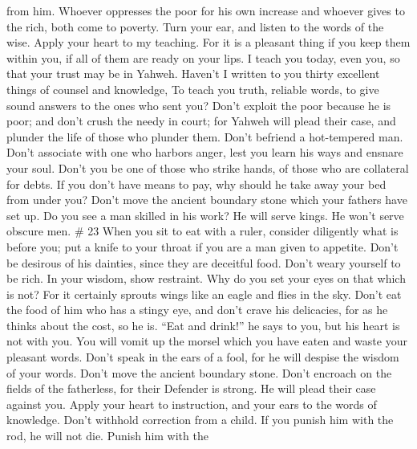 from him.  Whoever oppresses the poor for his own
increase and whoever gives to the rich, both come to poverty.
 Turn your ear, and listen to the words of the wise.
Apply your heart to my teaching.  For it is a pleasant
thing if you keep them within you, if all of them are ready on your
lips.  I teach you today, even you, so that your trust
may be in Yahweh.  Haven't I written to you thirty
excellent things of counsel and knowledge,  To teach you
truth, reliable words, to give sound answers to the ones who sent you?
 Don't exploit the poor because he is poor; and don't
crush the needy in court;  for Yahweh will plead their
case, and plunder the life of those who plunder them. 
Don't befriend a hot-tempered man. Don't associate with one who harbors
anger,  lest you learn his ways and ensnare your soul.
 Don't you be one of those who strike hands, of those who
are collateral for debts.  If you don't have means to
pay, why should he take away your bed from under you? 
Don't move the ancient boundary stone which your fathers have set up.
 Do you see a man skilled in his work? He will serve
kings. He won't serve obscure men. \# 23  When you sit to
eat with a ruler, consider diligently what is before you; 
put a knife to your throat if you are a man given to appetite.
 Don't be desirous of his dainties, since they are
deceitful food.  Don't weary yourself to be rich. In your
wisdom, show restraint.  Why do you set your eyes on that
which is not? For it certainly sprouts wings like an eagle and flies in
the sky.  Don't eat the food of him who has a stingy eye,
and don't crave his delicacies,  for as he thinks about
the cost, so he is. ``Eat and drink!'' he says to you, but his heart is
not with you.  You will vomit up the morsel which you have
eaten and waste your pleasant words.  Don't speak in the
ears of a fool, for he will despise the wisdom of your words.
 Don't move the ancient boundary stone. Don't encroach on
the fields of the fatherless,  for their Defender is
strong. He will plead their case against you.  Apply your
heart to instruction, and your ears to the words of knowledge.
 Don't withhold correction from a child. If you punish
him with the rod, he will not die.  Punish him with the
